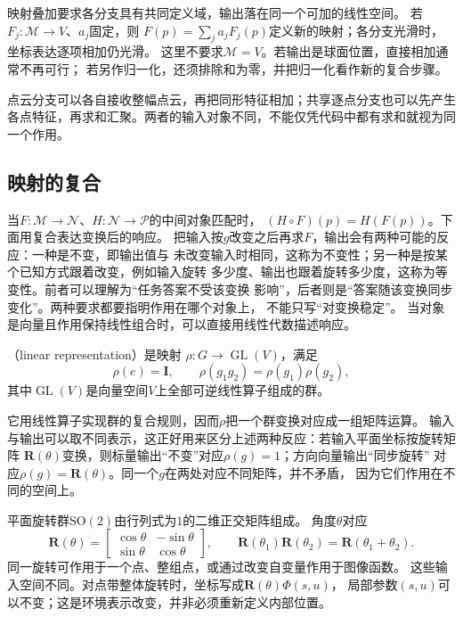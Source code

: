 映射叠加要求各分支具有共同定义域，输出落在同一个可加的线性空间。
若$F_j:\mathcal M\to V$、$a_j$固定，则
$F(p)=\sum_j a_jF_j(p)$定义新的映射；各分支光滑时，坐标表达逐项相加仍光滑。
这里不要求$\mathcal M=V$。若输出是球面位置，直接相加通常不再可行；
若另作归一化，还须排除和为零，并把归一化看作新的复合步骤。

点云分支可以各自接收整幅点云，再把同形特征相加；共享逐点分支也可以先产生
各点特征，再求和汇聚。两者的输入对象不同，不能仅凭代码中都有求和就视为同一个作用。

\subsection{映射的复合}
\label{sec:geometry-map-composition}
\label{sec:geometry-group-invariance-equivariance}


当$F:\mathcal M\to\mathcal N$、$H:\mathcal N\to\mathcal P$的中间对象匹配时，
$(H\circ F)(p)=H(F(p))$。下面用复合表达变换后的响应。
把输入按$g$改变之后再求$F$，输出会有两种可能的反应：一种是不变，即输出值与
未改变输入时相同，这称为不变性；另一种是按某个已知方式跟着改变，例如输入旋转
多少度、输出也跟着旋转多少度，这称为等变性。前者可以理解为“任务答案不受该变换
影响”，后者则是“答案随该变换同步变化”。两种要求都要指明作用在哪个对象上，
不能只写“对变换稳定”。
当对象是向量且作用保持线性组合时，可以直接用线性代数描述响应。
\begin{definition}[线性表示]
\label{def:geometry-linear-representation}
（linear representation）是映射
$\rho:G\to\operatorname{GL}(V)$，满足
\begin{equation}
 \rho(e)=\bm I,\qquad \rho(g_1g_2)=\rho(g_1)\rho(g_2),
 \label{eq:geometry-linear-representation}
\end{equation}
其中$\operatorname{GL}(V)$是向量空间$V$上全部可逆线性算子组成的群。
\end{definition}
它用线性算子实现群的复合规则，因而$\rho$把一个群变换对应成一组矩阵运算。
输入与输出可以取不同表示，这正好用来区分上述两种反应：若输入平面坐标按旋转矩阵
$\bm R(\theta)$变换，则标量输出“不变”对应$\rho(g)=1$；方向向量输出“同步旋转”
对应$\rho(g)=\bm R(\theta)$。同一个$g$在两处对应不同矩阵，并不矛盾，
因为它们作用在不同的空间上。

平面旋转群$\mathrm{SO}(2)$由行列式为$1$的二维正交矩阵组成。
角度$\theta$对应
\begin{equation}
 \bm R(\theta)=
 \begin{bmatrix}\cos\theta&-\sin\theta\\\sin\theta&\cos\theta\end{bmatrix},
 \qquad
 \bm R(\theta_1)\bm R(\theta_2)=\bm R(\theta_1+\theta_2).
 \label{eq:geometry-planar-rotation-group}
\end{equation}
同一旋转可作用于一个点、整组点，或通过改变自变量作用于图像函数。
这些输入空间不同。对点带整体旋转时，坐标写成$\bm R(\theta)\Phi(s,u)$，
局部参数$(s,u)$可以不变；这是环境表示改变，并非必须重新定义内部位置。

